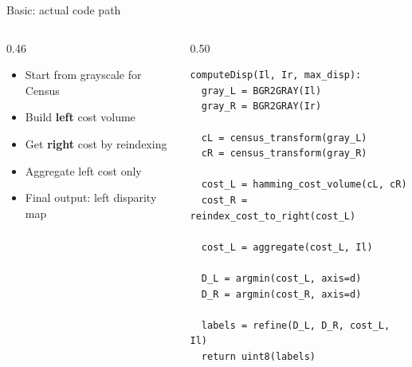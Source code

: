 \documentclass[aspectratio=169,11pt]{beamer}
\begin{document}
\begin{frame}[fragile]{Basic: actual code path}
\begin{columns}[T,totalwidth=\textwidth]
\begin{column}{0.46\textwidth}
\begin{itemize}
    \item Start from grayscale for Census
    \item Build \textbf{left} cost volume
    \item Get \textbf{right} cost by reindexing
    \item Aggregate left cost only
    \item Final output: left disparity map
\end{itemize}
\end{column}
\begin{column}{0.50\textwidth}
\scriptsize
\begin{verbatim}
computeDisp(Il, Ir, max_disp):
  gray_L = BGR2GRAY(Il)
  gray_R = BGR2GRAY(Ir)

  cL = census_transform(gray_L)
  cR = census_transform(gray_R)

  cost_L = hamming_cost_volume(cL, cR)
  cost_R = reindex_cost_to_right(cost_L)

  cost_L = aggregate(cost_L, Il)

  D_L = argmin(cost_L, axis=d)
  D_R = argmin(cost_R, axis=d)

  labels = refine(D_L, D_R, cost_L, Il)
  return uint8(labels)
\end{verbatim}
\end{column}
\end{columns}
\end{frame}

\end{document}
